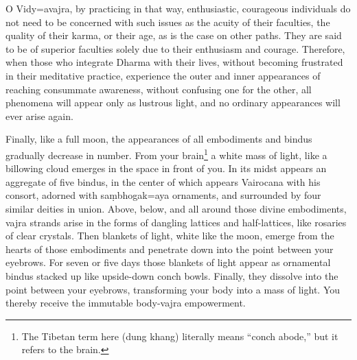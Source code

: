 \documentclass[11pt,twocolumn]{article}
\begin{document}
O Vidy\a={a}vajra, by practicing in that way, enthusiastic, courageous
individuals do not need to be concerned with such issues as the acuity
of their faculties, the quality of their karma, or their age, as is
the case on other paths. They are said to be of superior faculties
solely due to their enthusiasm and courage. Therefore, when those who
integrate Dharma with their lives, without becoming frustrated in
their meditative practice, experience the outer and inner appearances
of reaching consummate awareness, without confusing one for the other,
all phenomena will appear only as lustrous light, and no ordinary
appearances will ever arise again.

Finally, like a full moon, the appearances of all embodiments and
bindus gradually decrease in number. From your brain\footnote{The
  Tibetan term here (dung khang) literally means ``conch abode,'' but
  it refers to the brain.} a white mass of light, like a billowing
cloud emerges in the space in front of you. In its midst appears an
aggregate of five bindus, in the center of which appears Vairocana
with his consort, adorned with sa\d{m}bhogak\a={a}ya ornaments, and
surrounded by four similar deities in union. Above, below, and all
around those divine embodiments, vajra strands arise in the forms of
dangling lattices and half\hyp{}lattices, like rosaries of clear
crystals. Then blankets of light, white like the moon, emerge from the
hearts of those embodiments and penetrate down into the point between
your eyebrows. For seven or five days those blankets of light appear
as ornamental bindus stacked up like upside\hyp{}down conch
bowls. Finally, they dissolve into the point between your eyebrows,
transforming your body into a mass of light. You thereby receive the
immutable body\hyp{}vajra empowerment.
\end{document}
